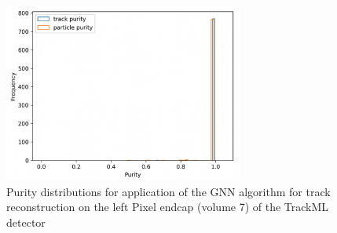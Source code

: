 





\begin{figure}[htbp]
    \centering
    \includegraphics[width=0.7\textwidth]{images/7-results/endcap-purity.png}
    \caption{Purity distributions for application of the GNN algorithm for track reconstruction on the left Pixel endcap (volume 7) of the TrackML detector}
    \label{fig:trackml-results-endcap-nodes-purity}%
\end{figure}


